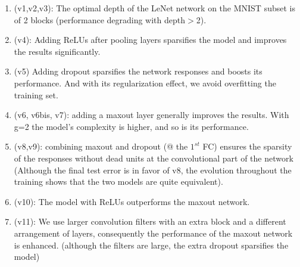 \documentclass[11pt]{article}
\renewcommand\textbullet{\ensuremath{\bullet}}
\begin{document}
	\begin{enumerate}[label={\textbullet}]
	\item (v1,v2,v3): The optimal depth of the LeNet network on the MNIST subset is of 2 blocks (performance degrading with depth$>$2).
	\item (v4): Adding ReLUs after pooling layers sparsifies the model and improves the results significantly.
	\item (v5) Adding dropout sparsifies the network responses and boosts its performance. And with its regularization effect, we avoid overfitting the training set.
	\item (v6, v6bis, v7): adding a maxout layer generally improves the results. With g=2 the model's complexity is higher, and so is its performance.
	\item (v8,v9): combining maxout and dropout (@ the $1^{st}$ FC) ensures the sparsity of the responses without dead units at the convolutional part of the network (Although the final test error is in favor of v8, the evolution throughout the training shows that the two models are quite equivalent).
	\item (v10): The model with ReLUs outperforms the maxout network.
	\item (v11): We use larger convolution filters with an extra block and a different arrangement of layers, consequently the performance of the maxout network is enhanced. (although the filters are large, the extra dropout sparsifies the model)
	\end{enumerate}
\end{document}
